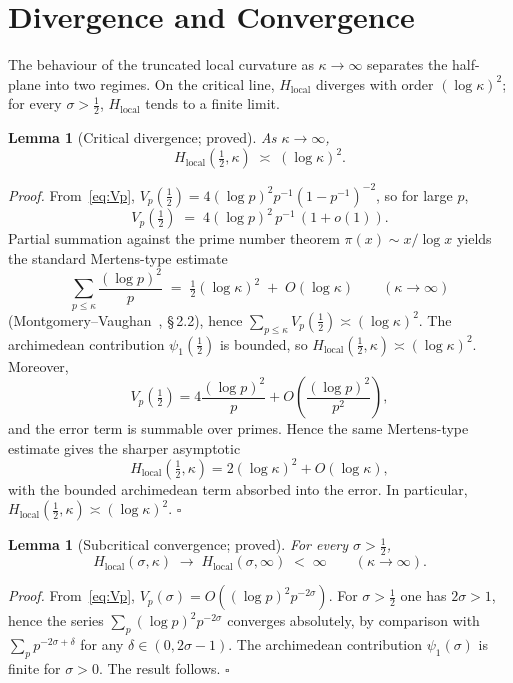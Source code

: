 \documentclass[11pt]{article}
\newtheorem{lemma}[theorem]{Lemma}
\newcommand{\Hlocal}{H_{\mathrm{local}}}
\begin{document}
\section{Divergence and Convergence}
\label{sec:divergence}

The behaviour of the truncated local curvature as
$\kappa\to\infty$ separates the half-plane into two regimes.
On the critical line, $\Hlocal$ diverges with order
$(\log\kappa)^{2}$; for every $\sigma>\tfrac12$, $\Hlocal$
tends to a finite limit.

\begin{lemma}[Critical divergence; proved]
\label{lem:critical-div}
As $\kappa\to\infty$,
\[
\Hlocal(\tfrac12,\kappa)
\;\asymp\;(\log\kappa)^{2}.
\]
\end{lemma}

\emph{Proof.}
From~\eqref{eq:Vp},
$V_p(\tfrac12)=4(\log p)^{2}p^{-1}(1-p^{-1})^{-2}$, so for
large $p$,
\[
V_p(\tfrac12)\;=\;4(\log p)^{2}\,p^{-1}\,(1+o(1)).
\]
Partial summation against the prime number theorem
$\pi(x)\sim x/\log x$ yields the standard Mertens-type
estimate
\[
\sum_{p\le\kappa}\frac{(\log p)^{2}}{p}
\;=\;\tfrac{1}{2}(\log\kappa)^{2}\;+\;O(\log\kappa)
\qquad(\kappa\to\infty)
\]
(Montgomery--Vaughan~\cite{MontgomeryVaughan}, \S\,2.2),
hence
$\sum_{p\le\kappa}V_p(\tfrac12)\asymp(\log\kappa)^{2}$.
The archimedean contribution $\psi_1(\tfrac12)$ is bounded,
so $\Hlocal(\tfrac12,\kappa)\asymp(\log\kappa)^{2}$.
Moreover,
\[
V_p(\tfrac12)
=4\frac{(\log p)^2}{p}+O\!\left(\frac{(\log p)^2}{p^2}\right),
\]
and the error term is summable over primes. Hence the same
Mertens-type estimate gives the sharper asymptotic
\[
\Hlocal(\tfrac12,\kappa)
=2(\log\kappa)^2+O(\log\kappa),
\]
with the bounded archimedean term absorbed into the error.
In particular, $\Hlocal(\tfrac12,\kappa)\asymp(\log\kappa)^2$.
\hfill$\square$

\begin{lemma}[Subcritical convergence; proved]
\label{lem:subcrit-conv}
For every $\sigma>\tfrac12$,
\[
\Hlocal(\sigma,\kappa)
\;\to\;\Hlocal(\sigma,\infty)\;<\;\infty
\qquad(\kappa\to\infty).
\]
\end{lemma}

\emph{Proof.}
From~\eqref{eq:Vp},
$V_p(\sigma)=O((\log p)^{2}p^{-2\sigma})$.
For $\sigma>\tfrac12$ one has $2\sigma>1$, hence the series
$\sum_{p}(\log p)^{2}p^{-2\sigma}$ converges absolutely, by
comparison with $\sum_p p^{-2\sigma+\delta}$ for any
$\delta\in(0,2\sigma-1)$.
The archimedean contribution $\psi_1(\sigma)$ is finite for
$\sigma>0$.
The result follows.
\hfill$\square$
\end{document}
